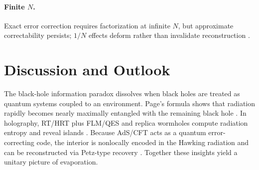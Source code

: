 \documentclass[12pt, numbers, sort&compress]{article}
\begin{document}
\paragraph{Finite $N$.}
Exact error correction requires factorization at infinite $N$, but approximate correctability persists; $1/N$ effects deform rather than invalidate reconstruction \cite{Hayden:2024approximate}.

\section{Discussion and Outlook}
The black-hole information paradox dissolves when black holes are treated as quantum systems coupled to an environment. Page’s formula shows that radiation rapidly becomes nearly maximally entangled with the remaining black hole \cite{Page:1993prl}. In holography, RT/HRT plus FLM/QES and replica wormholes compute radiation entropy and reveal islands \cite{Ryu:2006prl,Faulkner:2013FLM,EngelhardtWall:2015QES,SciPost:2020islands,Penington:2023replica}. Because AdS/CFT acts as a quantum error-correcting code, the interior is nonlocally encoded in the Hawking radiation and can be reconstructed via Petz-type recovery \cite{ADH:2015,JLMS:2016,Penington:2019petz}. Together these insights yield a unitary picture of evaporation.
\end{document}
